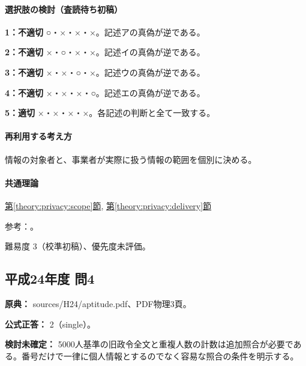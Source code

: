 \paragraph{選択肢の検討（査読待ち初稿）}\mbox{}\par

\noindent\textbf{1：不適切} ○・×・×・×。記述アの真偽が逆である。\par

\noindent\textbf{2：不適切} ×・○・×・×。記述イの真偽が逆である。\par

\noindent\textbf{3：不適切} ×・×・○・×。記述ウの真偽が逆である。\par

\noindent\textbf{4：不適切} ×・×・×・○。記述エの真偽が逆である。\par

\noindent\textbf{5：適切} ×・×・×・×。各記述の判断と全て一致する。\par

\paragraph{再利用する考え方} 情報の対象者と、事業者が実際に扱う情報の範囲を個別に決める。

\paragraph{共通理論} \hyperref[theory:privacy:scope]{第\ref*{theory:privacy:scope}節}, \hyperref[theory:privacy:delivery]{第\ref*{theory:privacy:delivery}節}

\par 参考：\cite{privacy_general,privacy_delivery}。

\par 難易度 3（校準初稿）、優先度未評価。

\subsection{平成24年度 問4}
\label{q:h24-reg-apt-04}

\noindent\textbf{原典：} sources/H24/aptitude.pdf、PDF物理3頁。

\textbf{公式正答：} 2（single）。

\par\textbf{検討未確定：} 5000人基準の旧政令全文と重複人数の計数は追加照合が必要である。番号だけで一律に個人情報とするのでなく容易な照合の条件を明示する。

